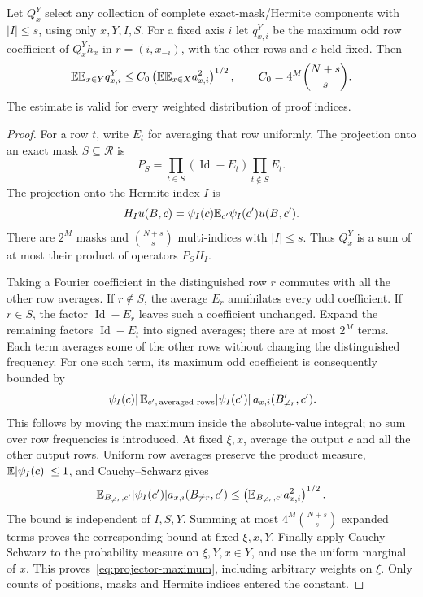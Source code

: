 \begin{lemma}
\label{lem:projected-row-atom}
Let $Q_x^Y$ select any collection of complete exact-mask/Hermite
components with $|I|\le s$, using only $x,Y,I,S$.
For a fixed axis $i$ let $q_{x,i}^Y$ be the maximum odd row coefficient
of $Q_x^Yh_x$ in $r=(i,x_{-i})$, with the other rows and $c$ held fixed.
Then
\begin{equation}\label{eq:projector-maximum}
 \mathbb E\mathbb E_{x\in Y}q_{x,i}^Y
 \le C_0\left(\mathbb E\mathbb E_{x\in X}a_{x,i}^2\right)^{1/2},
 \qquad C_0=4^M\binom{N+s}{s}.
\end{equation}
The estimate is valid for every weighted distribution of proof indices.
\end{lemma}
\begin{proof}
For a row $t$, write $E_t$ for averaging that row uniformly. The
projection onto an exact mask $S\subseteq\mathcal R$ is
\[
 P_S=\prod_{t\in S}(\operatorname{Id}-E_t)
       \prod_{t\notin S}E_t.
\]
The projection onto the Hermite index $I$ is
\[
 H_Iu(B,c)=\psi_I(c)\mathbb E_{c'}\psi_I(c')u(B,c').
\]
There are $2^M$ masks and $\binom{N+s}{s}$ multi-indices with
$|I|\le s$. Thus $Q_x^Y$ is a sum of at most their product of
operators $P_SH_I$.

Taking a Fourier coefficient in the distinguished row $r$ commutes with
all the other row averages. If $r\notin S$, the average $E_r$
annihilates every odd coefficient. If $r\in S$, the factor
$\operatorname{Id}-E_r$ leaves such a coefficient unchanged. Expand
the remaining factors $\operatorname{Id}-E_t$ into signed averages;
there are at most $2^M$ terms. Each term averages some of the other
rows without changing the distinguished frequency. For one such term,
its maximum odd coefficient is consequently bounded by
\[
 |\psi_I(c)|\,
 \mathbb E_{c',\,\text{averaged rows}}
       |\psi_I(c')|\,a_{x,i}(B'_{\ne r},c').
\]
This follows by moving the maximum inside the absolute-value integral;
no sum over row frequencies is introduced. At fixed $\xi,x$, average
the output $c$ and all the other output rows. Uniform row averages
preserve the product measure, $\mathbb E|\psi_I(c)|\le1$, and
Cauchy--Schwarz gives
\[
 \mathbb E_{B_{\ne r},c'}|\psi_I(c')|a_{x,i}(B_{\ne r},c')
 \le\left(\mathbb E_{B_{\ne r},c'}a_{x,i}^2\right)^{1/2}.
\]
The bound is independent of $I,S,Y$. Summing at most
$4^M\binom{N+s}{s}$ expanded terms proves the corresponding bound at
fixed $\xi,x,Y$. Finally apply Cauchy--Schwarz to the probability
measure on $\xi,Y,x\in Y$, and use the uniform marginal of $x$.
This proves~\eqref{eq:projector-maximum}, including arbitrary weights
on $\xi$. Only counts of positions, masks and Hermite indices entered
the constant.
\end{proof}


